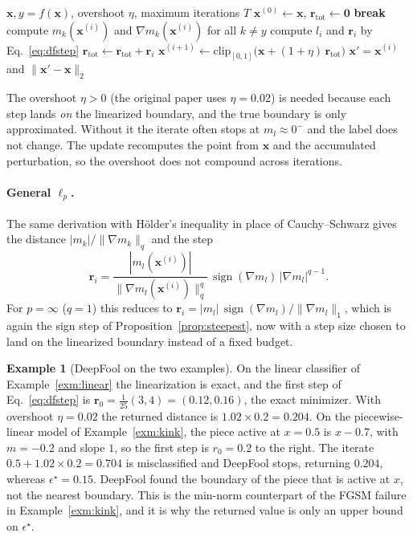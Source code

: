 \documentclass[10pt,a4paper]{extarticle}
\theoremstyle{definition}
\newtheorem{example}{Example}[section]
\newcommand{\x}{\mathbf{x}}
\newcommand{\xadv}{\mathbf{x}'}
\DeclareMathOperator{\sign}{sign}
\begin{document}
\begin{algorithm}[h]
\caption{DeepFool, \(\ell_2\), untargeted}
\begin{algorithmic}[1]
\Require \(\x, y=f(\x)\), overshoot \(\eta\), maximum iterations \(T\)
\State \(\x^{(0)}\gets\x\), \(\mathbf{r}_{\mathrm{tot}}\gets\mathbf{0}\)
  \If{\(f(\x^{(i)})\neq y\)} \textbf{break} \EndIf
  \State compute \(m_k(\x^{(i)})\) and \(\nabla m_k(\x^{(i)})\) for all \(k\neq y\) 
  \State compute \(l_i\) and \(\mathbf{r}_i\) by Eq.~\eqref{eq:dfstep}
  \State \(\mathbf{r}_{\mathrm{tot}}\gets\mathbf{r}_{\mathrm{tot}}+\mathbf{r}_i\)
  \State \(\x^{(i+1)}\gets\mathrm{clip}_{[0,1]}\big(\x+(1+\eta)\,\mathbf{r}_{\mathrm{tot}}\big)\)
\EndFor
\State \Return \(\xadv=\x^{(i)}\) and \(\|\xadv-\x\|_2\)
\end{algorithmic}
\end{algorithm}

The overshoot \(\eta>0\) (the original paper uses \(\eta=0.02\)) is needed because each step lands \emph{on} the linearized boundary, and the true boundary is only approximated. Without it the iterate often stops at \(m_{l}\approx0^-\) and the label does not change. The update recomputes the point from \(\x\) and the accumulated perturbation, so the overshoot does not compound across iterations.

\paragraph{General \(\ell_p\).} The same derivation with Hölder's inequality in place of Cauchy--Schwarz gives the distance \(|m_k|/\|\nabla m_k\|_q\) and the step
\[
\mathbf{r}_i=\frac{|m_{l}(\x^{(i)})|}{\|\nabla m_{l}(\x^{(i)})\|_q^{q}}\,\sign(\nabla m_{l})\,|\nabla m_{l}|^{q-1}.
\]
For \(p=\infty\) (\(q=1\)) this reduces to \(\mathbf{r}_i=|m_l|\,\sign(\nabla m_l)/\|\nabla m_l\|_1\), which is again the sign step of Proposition~\ref{prop:steepest}, now with a step size chosen to land on the linearized boundary instead of a fixed budget.

\begin{example}[DeepFool on the two examples]\label{exm:deepfool}
On the linear classifier of Example~\ref{exm:linear} the linearization is exact, and the first step of Eq.~\eqref{eq:dfstep} is \(\mathbf{r}_0=\tfrac{1}{25}(3,4)=(0.12,0.16)\), the exact minimizer. With overshoot \(\eta=0.02\) the returned distance is \(1.02\times0.2=0.204\). On the piecewise-linear model of Example~\ref{exm:kink}, the piece active at \(x=0.5\) is \(x-0.7\), with \(m=-0.2\) and slope \(1\), so the first step is \(r_0=0.2\) to the right. The iterate \(0.5+1.02\times0.2=0.704\) is misclassified and DeepFool stops, returning \(0.204\), whereas \(\epsilon^\star=0.15\). DeepFool found the boundary of the piece that is active at \(x\), not the nearest boundary. This is the min-norm counterpart of the FGSM failure in Example~\ref{exm:kink}, and it is why the returned value is only an upper bound on \(\epsilon^\star\).
\end{example}
\end{document}
